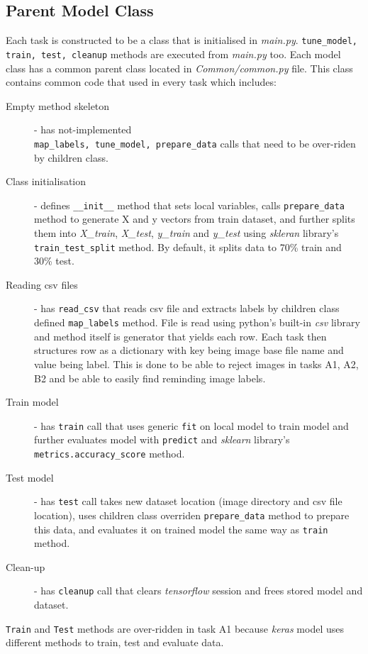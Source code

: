 \documentclass{article}
\begin{document}
\subsection{Parent Model Class}
\label{sub:parent_class}
Each task is constructed to be a class that is initialised in \textit{main.py}. \texttt{tune\_model, train, test, cleanup} methods are executed from \textit{main.py} too. Each model class has a common parent class located in \textit{Common/common.py} file. This class contains common code that used in every task which includes:
\begin{description}
	\item[Empty method skeleton] - has not-implemented \\\texttt{map\_labels, tune\_model, prepare\_data} calls that need to be over-riden by children class.
	\item[Class initialisation] - defines \texttt{\_\_init\_\_} method that sets local variables, calls \texttt{prepare\_data} method to generate X and y vectors from train dataset, and further splits them into \textit{X\_train}, \textit{X\_test}, \textit{y\_train} and \textit{y\_test} using 
	\textit{skleran} library's \texttt{train\_test\_split} method. By default, it splits data to 70\% train and 30\% test.
	\item[Reading csv files] - has \texttt{read\_csv} that reads csv file and extracts labels by children class defined \texttt{map\_labels} method. File is read using python's built-in \textit{csv} library and method itself is generator that yields each row. Each task then structures row as a dictionary with key being image base file name and value being label. This is done to be able to reject images in tasks A1, A2, B2 and be able to easily find reminding image labels. 
	\item[Train model] - has \texttt{train} call that uses generic \texttt{fit} on local model to train model and further evaluates model with \texttt{predict} and \textit{sklearn} library's \\\texttt{metrics.accuracy\_score} method.
	\item[Test model] - has \texttt{test} call takes new dataset location (image directory and csv file location), uses children class overriden \texttt{prepare\_data} method to prepare this data, and evaluates it on trained model the same way as \texttt{train} method.
	\item[Clean-up] - has \texttt{cleanup} call that clears \textit{tensorflow} session and frees stored model and dataset.
\end{description}
\texttt{Train} and \texttt{Test} methods are over-ridden in task A1 because \textit{keras} model uses different methods to train, test and evaluate data. 
\end{document}
